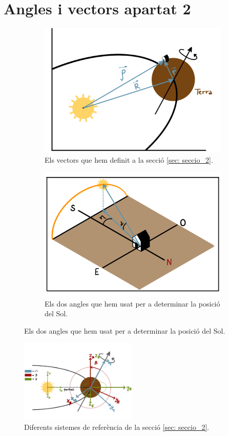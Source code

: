 \documentclass[11pt]{article}
\begin{document}
\section{Angles i vectors apartat 2}
\begin{figure}[hbt]
    \centering
    \begin{subfigure}{0.5\textwidth}
        \centering
        \includegraphics[width=\textwidth]{vectors.PNG}
        \caption{Els vectors que hem definit a la secció \ref{sec: seccio_2}.}
        \label{fig: sist_vectors}
    \end{subfigure}%
    \hspace{0.000001\textwidth}%
    \begin{subfigure}{0.5\textwidth}
        \centering
        \includegraphics[width=\textwidth]{ang_sol.PNG}
        \caption{Els dos angles que hem usat per a determinar la posició del Sol.}
        \label{fig: sist_sol}
    \end{subfigure}
\end{figure}

\begin{figure}[hbt]
    \centering
    \includegraphics[width=0.5\textwidth]{sist_ref.PNG}
    \caption{Diferents sistemes de referència de la secció \ref{sec: seccio_2}.}
    \label{fig: sist_ref}
\end{figure}
\end{document}
